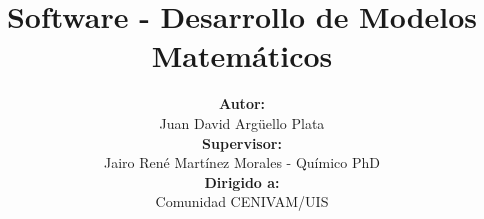 \documentclass[12]{beamer}
\title[Software Modelado Matemático]{\textbf{Software - Desarrollo de Modelos Matem\'aticos}}
\author[Juan David]{
\textbf{Autor:}\\
Juan David Argüello Plata\\
\textbf{Supervisor:}\\
Jairo René Martínez Morales - Químico PhD\\
\textbf{Dirigido a:}\\
Comunidad CENIVAM/UIS
}
\institute[UIS]{
	CENIVAM\\
	Universidad Industrial de Santander
}
\date{}
\begin{document}
\begin{frame}
\titlepage
\end{frame}







\end{document}
